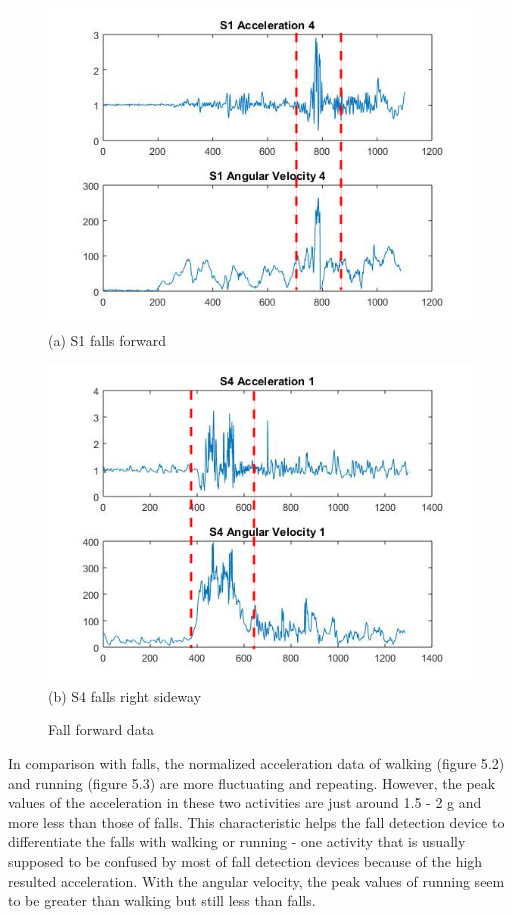\documentclass[letterpaper,12pt,titlepage,oneside,final]{book}
\begin{document}
\begin{figure}[h!]
	\hspace{-1cm}
	\centering
	\begin{minipage}[b]{0.5\textwidth}
		\centering
		\includegraphics[scale=0.42]{hieu4}
		(a) S1 falls forward
	\end{minipage}%
	\hfill
	\begin{minipage}[b]{0.5\textwidth}
		\centering
		\includegraphics[scale=0.42]{phuc1}
		(b) S4 falls right sideway
	\end{minipage}	
	\caption{Fall forward data}
\end{figure}
In comparison with falls, the normalized acceleration data of walking (figure 5.2) and running (figure 5.3) are more fluctuating and repeating. However, the peak values of the acceleration in these two activities are just around 1.5 - 2 g and more less than those of falls. This characteristic helps the fall detection device to differentiate the falls with walking or running - one activity that is usually supposed to be confused by most of fall detection devices because of the high resulted acceleration. With the angular velocity, the peak values of running seem to be greater than walking but still less than falls.
\end{document}
